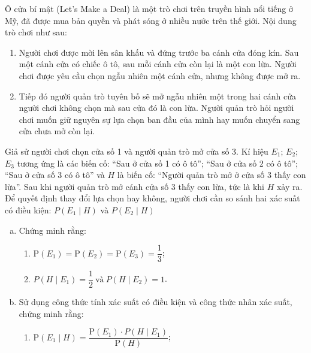 \begin{vd}[KNTT]%
	Ô cửa bí mật (Let's Make a Deal) là một trò chơi trên truyền hình nổi tiếng ở Mỹ, đã được mua bản quyền và phát sóng ở nhiều nước trên thế giới. Nội dung trò chơi như sau:
	\begin{enumerate}[$\bullet$]
		\item Người chơi được mời lên sân khấu và đứng trước ba cánh cửa đóng kín. Sau một cánh cửa có chiếc ô tô, sau mỗi cánh cửa còn lại là một con lừa. Người chơi được yêu cầu chọn ngẫu nhiên một cánh cửa, nhưng không được mở ra.
		\item Tiếp đó người quản trò tuyên bố sẽ mở ngẫu nhiên một trong hai cánh cửa người chơi không chọn mà sau cửa đó là con lừa. Người quản trò hỏi người chơi muốn giữ nguyên sự lựa chọn ban đầu của mình hay muốn chuyển sang cửa chưa mở còn lại.
	\end{enumerate}
	Giả sử người chơi chọn cửa số 1 và người quản trò mở cửa số 3. Kí hiệu $E_1$; $E_2$; $E_3$ tương ứng là các biến cố: ``Sau ở cửa số 1 có ô tô''; ``Sau ở cửa số 2 có ô tô''; ``Sau ở cửa số 3 có ô tô'' và $H$ là biến cố: ``Người quản trò mở ở cửa số 3 thấy con lừa''.
	Sau khi người quản trò mở cánh cửa số 3 thấy con lừa, tức là khi $H$ xảy ra. Để quyết định thay đổi lựa chọn hay không, người chơi cần so sánh hai xác suất có điều kiện: $P\left(E_1\mid H\right)$ và $P\left(E_2\mid H\right)$
	\begin{enumerate}[a)]
		\item Chứng minh rằng:
		\begin{enumerate}[$\bullet$]
			\item $\mathrm{P}(E_1)=\mathrm{P}(E_2)=\mathrm{P}(E_3)=\dfrac{1}{3}$;
			\item $P\left(H \mid E_1\right)=\dfrac{1}{2} ~\text{và}~P\left(H \mid E_2\right)=1$.
		\end{enumerate}
		\item Sử dụng công thức tính xác suất có điều kiện và công thức nhân xác suất, chứng minh rằng:
		\begin{enumerate}[$\bullet$]
			\item $ \mathrm{P}\left(E_1 \mid H\right)=\dfrac{\mathrm{P}(E_1) \cdot P\left(H \mid E_1\right)}{\mathrm{P}(H)}$;

\end{enumerate}
\end{enumerate}
\end{vd}
